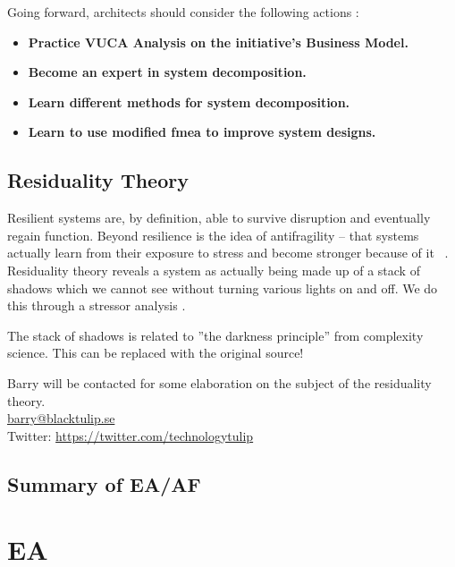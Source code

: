 Going forward, architects should consider the following actions \parencite[p. 889]{OReilly2019}:
\begin{itemize}
	\item{\textbf{Practice VUCA Analysis on the initiative's Business Model.}}
	\item{\textbf{Become an expert in system decomposition.}}
	\item{\textbf{Learn different methods for system decomposition.}}
	\item{\textbf{Learn to use modified \acrshort{fmea} to improve system designs.}}
\end{itemize}

\subsection{Residuality Theory}
\label{sub:sfresiduality}
Resilient systems are, by definition, able to survive disruption and eventually regain function. Beyond resilience is the
idea of antifragility – that systems actually learn from their exposure to stress and become stronger because of it \parencite{Taleb2012}\ \parencite[p. 876]{OReilly2020}. Residuality theory reveals a system as actually being made up of a stack of shadows which we cannot see without turning various lights on and off. We do this through a stressor analysis \parencite[p. 877]{OReilly2020}.

\begin{remark}
	The stack of shadows is related to ''the darkness principle'' \parencite[p. 78]{Richardson2004} from complexity science. This can be replaced with the original source!
\end{remark}

\begin{remark}
	Barry will be contacted for some elaboration on the subject of the residuality theory.\\
	\href{mailto:barry@blacktulip.se}{barry@blacktulip.se}\\
	Twitter: \href{https://twitter.com/technologytulip}{https://twitter.com/technologytulip}
\end{remark}

\subsection{Summary of EA/AF}
\label{sub:sfsummaryantifragile}

\section{EA}
\label{sec:sfenterprisearchitecture}



